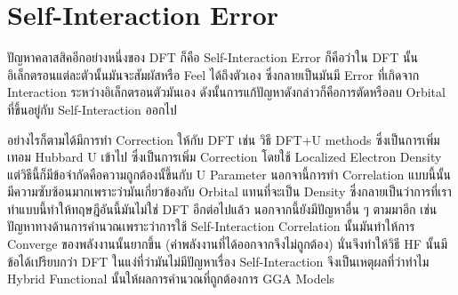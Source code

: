 \section{Self-Interaction Error}

ปัญหาคลาสสิคอีกอย่างหนึ่งของ DFT ก็คือ Self-Interaction Error ก็คือว่าใน DFT นั้น อิเล็กตรอนแต่ละตัวนั้นมันจะสัมผัสหรือ Feel ได้ถึงตัวเอง ซึ่งกลายเป็นมันมี Error ที่เกิดจาก Interaction ระหว่างอิเล็กตรอนตัวมันเอง ดังนั้นการแก้ปัญหาดังกล่าวก็คือการตัดหรือลบ Orbital ที่ขึ้นอยู่กับ Self-Interaction ออกไป 

อย่างไรก็ตามได้มีการทำ Correction ให้กับ DFT เช่น วิธี DFT+U methods ซึ่งเป็นการเพิ่มเทอม Hubbard U เข้าไป ซึ่งเป็นการเพิ่ม Correction โดยใช้ Localized Electron Density แต่วิธีนี้ก็มีข้อจำกัดคือความถูกต้องนั้ขึ้นกับ U Parameter นอกจานี้การทำ Correlation แบบนี้นั้นมีความซับซ้อนมากเพราะว่ามันเกี่ยวข้องกับ Orbital แทนที่จะเป็น Density ซึ่งกลายเป็นว่าการที่เราทำแบบนี้ทำให้ทฤษฎีอันนี้มันไม่ใช่ DFT อีกต่อไปแล้ว นอกจากนี้ยังมีปัญหาอื่น ๆ ตามมาอีก เช่น ปัญหาทางด้านการคำนวณเพราะว่าการใช้ Self-Interaction Correlation นั้นมันทำให้การ Converge ของพลังงานนั้นยากขึ้น (ค่าพลังงานที่ได้ออกจากจึงไม่ถูกต้อง) นั่นจึงทำให้วิธี HF นั้นมีข้อได้เปรียบกว่า DFT ในแง่ที่ว่ามันไม่มีปัญหาเรื่อง Self-Interaction จึงเป็นเหตุผลที่ว่าทำไม Hybrid Functional นั้นให้ผลการคำนวณที่ถูกต้องการ GGA Models 
